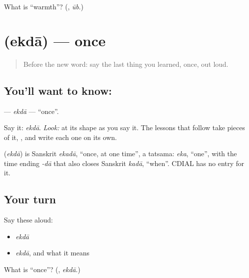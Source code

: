 \begin{tcolorbox}[breakable,colback=teal!4,colframe=teal!35!black,title={Before you move on}]
What is \textquotedblleft{}warmth\textquotedblright{}? (\textbf{}, \emph{ūb}.)
\end{tcolorbox}
\section[\texorpdfstring{\mr{एकदा} (ekdā)}{एकदा (ekdā)}]{ (ekdā) — once}

\label{lesson:MR-C08-ekda}



\begin{quote}
Before the new word: say the last thing you learned, once, out loud.
\end{quote}

\subsection*{You'll want to know: }
\textbf{} — \emph{ekdā} — \textquotedblleft{}once\textquotedblright{}.

Say it: \emph{ekdā}. \emph{Look:} at its shape as you say it. The lessons that follow take pieces of it, \textbf{}, and write each one on its own.

\begin{cousinweb}
\textbf{} (\emph{ekdā}) is Sanskrit \emph{ekadā}, \textquotedblleft{}once, at one time\textquotedblright{}, a tatsama: \emph{eka}, \textquotedblleft{}one\textquotedblright{}, with the time ending \emph{-dā} that also closes Sanskrit \emph{kadā}, \textquotedblleft{}when\textquotedblright{}. CDIAL has no entry for it.
\end{cousinweb}

\subsection*{Your turn}
Say these aloud:

\begin{itemize}
\raggedright
  \item \emph{ekdā}
  \item \emph{ekdā}, and what it means
\end{itemize}

\begin{tcolorbox}[breakable,colback=teal!4,colframe=teal!35!black,title={Before you move on}]
What is \textquotedblleft{}once\textquotedblright{}? (\textbf{}, \emph{ekdā}.)
\end{tcolorbox}
